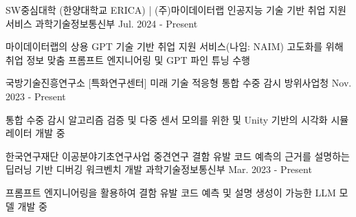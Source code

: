 \begin{cventries}



  \cventry
  {SW중심대학 (한양대학교 ERICA) | \faBuilding[regular] (주)마이데이터랩} %
  {인공지능 기술 기반 취업 지원 서비스} %
  {\faFlask\space 과학기술정보통신부} %
  {Jul. 2024 - Present} %
  {
    \begin{cvitems} %
      \item {마이데이터랩의 상용 GPT 기술 기반 취업 지원 서비스(나임: NAIM) 고도화를 위해 취업 정보 맞춤 프롬프트 엔지니어링 및 GPT 파인 튜닝 수행}
    \end{cvitems}
  }

\cventry
  {국방기술진흥연구소 [특화연구센터]} %
  {미래 기술 적응형 통합 수중 감시} %
  {\faFlask\space 방위사업청} %
  {Nov. 2023 - Present} %
  {
    \begin{cvitems} %
      \item {통합 수중 감시 알고리즘 검증 및 다중 센서 모의를 위한 및 Unity 기반의 시각화 시뮬레이터 개발 중}
    \end{cvitems}
  }

\cventry
  {한국연구재단 이공분야기초연구사업 중견연구} %
  {결함 유발 코드 예측의 근거를 설명하는 딥러닝 기반 디버깅 워크벤치 개발} %
  {\faFlask\space 과학기술정보통신부} %
  {Mar. 2023 - Present} %
  {
    \begin{cvitems} %
      \item {프롬프트 엔지니어링을 활용하여 결함 유발 코드 예측 및 설명 생성이 가능한 LLM 모델 개발 중}
    \end{cvitems}
  }


\end{cventries}
